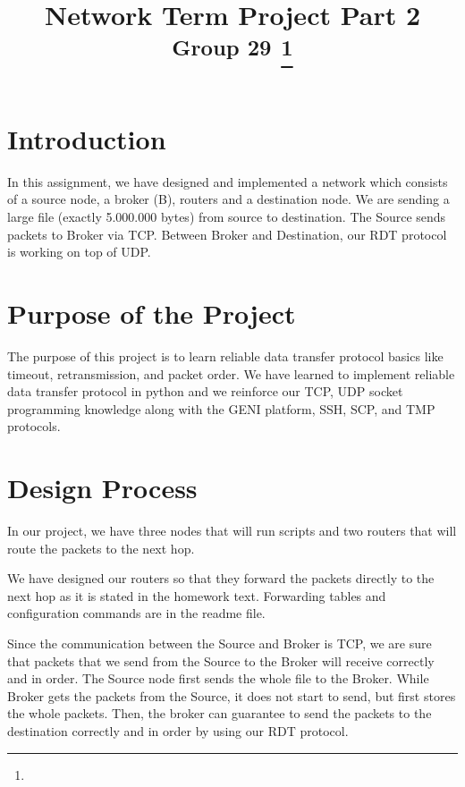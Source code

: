 \documentclass[conference]{IEEEtran}
\begin{document}
\title{Network Term Project Part 2 \\
{\textsuperscript{Group 29}}
\thanks{}
}

\author{
\and
{}
}

\maketitle

\section{Introduction}
In this assignment, we have designed and implemented a network which consists of a source node, a broker (B), routers and a destination node. We are sending a large file (exactly 5.000.000 bytes) from source to destination. The Source sends packets to Broker via TCP. Between Broker and Destination, our RDT protocol is working on top of UDP. 

\section{Purpose of the Project}
The purpose of this project is to learn reliable data transfer protocol basics like timeout, retransmission, and packet order. We have learned to implement reliable data transfer protocol in python and we reinforce our TCP, UDP socket programming knowledge along with the GENI platform, SSH, SCP, and TMP protocols.  

\section{Design Process}

In our project, we have three nodes that will run scripts and two routers that will route the packets to the next hop.

We have designed our routers so that they forward the packets directly to the next hop as it is stated in the homework text. Forwarding tables and configuration commands are in the readme file.

Since the communication between the Source and Broker is TCP, we are sure that packets that we send from the Source to the Broker will receive correctly and in order. The Source node first sends the whole file to the Broker. While Broker gets the packets from the Source, it does not start to send, but first stores the whole packets. Then, the broker can guarantee to send the packets to the destination correctly and in order by using our RDT protocol.
\end{document}
